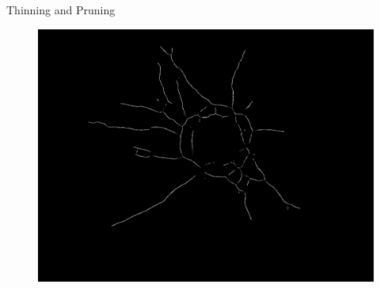 \documentclass{beamer}
\begin{document}
\begin{frame}{Thinning and Pruning}
	\begin{figure}
		\centering
		\includegraphics[width=\textwidth]{images/mono_skeletonized}
	\end{figure}
\end{frame}
\end{document}
